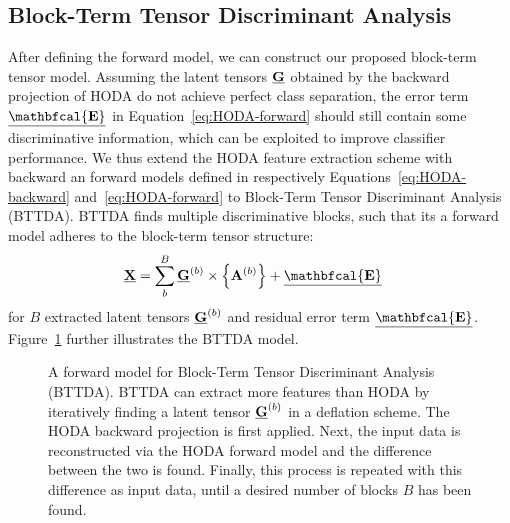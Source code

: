 \documentclass[twocolumn]{article}
\begin{document}
\subsection{Block-Term Tensor Discriminant Analysis}
After defining the forward model, we can construct our proposed block-term
tensor model.
Assuming the latent tensors $\underline{\mathbf{G}}$
obtained by the backward projection of \textsc{HODA} do not achieve perfect
class separation, the error term $\ten{\mathbfcal{E}}$ in
Equation~\ref{eq:HODA-forward} should still contain some discriminative
information, which can be exploited to improve classifier performance.
We thus extend the \textsc{HODA} feature extraction scheme with backward an
forward models defined in respectively Equations~\ref{eq:HODA-backward}
and~\ref{eq:HODA-forward} to Block-Term Tensor Discriminant Analysis
(\textsc{BTTDA}).
\textsc{BTTDA} finds multiple discriminative blocks, such that its a forward
model adheres to the block-term tensor structure:
\begin{align}
	\ten{X} & = \sum_b^B\ten{G}^{(b)}\mmpr{\mat{A}^{(b)}} + \ten{\mathbfcal{E}}
	\label{eq:BTTDA-forward}
\end{align}
for $B$ extracted latent tensors $\underline{\mathbf{G}}^{(b)}$ and residual error term
$\ten{\mathbfcal{E}}$.
Figure~\ref{fig:BTTDA} further illustrates the \textsc{BTTDA} model.
\begin{figure}[t]
	\centering
	
	\caption{A forward model for Block-Term Tensor Discriminant Analysis
		(\textsc{BTTDA}). \textsc{BTTDA} can extract more features
		than \textsc{HODA} by iteratively finding a latent tensor $\underline{\mathbf{G}}^{(b)}$ in a
		deflation scheme.
		The \textsc{HODA} backward projection is first applied. Next, the
		input data is reconstructed via the \textsc{HODA} forward model and the
		difference between the two is found.
		Finally, this process is repeated with this difference as input data, until a
		desired number of blocks $B$ has been found.}
	\label{fig:BTTDA}
\end{figure}
\end{document}
